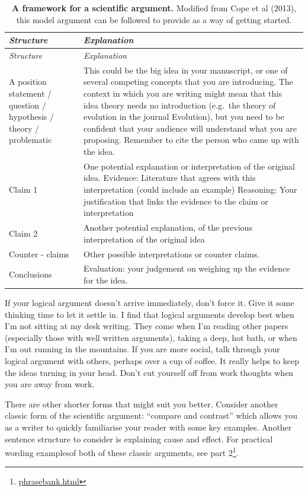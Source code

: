 \documentclass[
]{krantz}
\renewcommand{\href}[2]{#2\footnote{\url{#1}}}
\begin{document}
\begin{longtable}[]{@{}
  >{\raggedright\arraybackslash}p{}
  >{\raggedright\arraybackslash}p{}@{}}
\caption{\label{tab:argument} \textbf{A framework for a scientific argument.} Modified from Cope et al (2013), this model argument can be followed to provide as a way of getting started.}\tabularnewline
\toprule
\emph{Structure} & \emph{Explanation} \\
\midrule
\endfirsthead
\toprule
\emph{Structure} & \emph{Explanation} \\
\midrule
\endhead
A position statement / question / hypothesis / theory / problematic & This could be the big idea in your manuscript, or one of several competing concepts that you are introducing. The context in which you are writing might mean that this idea theory needs no introduction (e.g.~the theory of evolution in the journal Evolution), but you need to be confident that your audience will understand what you are proposing. Remember to cite the person who came up with the idea. \\
Claim 1 & One potential explanation or interpretation of the original idea. Evidence: Literature that agrees with this interpretation (could include an example) Reasoning: Your justification that links the evidence to the claim or interpretation \\
Claim 2 & Another potential explanation, of the previous interpretation of the original idea \\
Counter - claims & Other possible interpretations or counter claims. \\
Conclusions & Evaluation: your judgement on weighing up the evidence for the idea. \\
\bottomrule
\end{longtable}

If your logical argument doesn't arrive immediately, don't force it. Give it some thinking time to let it settle in. I find that logical arguments develop best when I'm not sitting at my desk writing. They come when I'm reading other papers (especially those with well written arguments), taking a deep, hot bath, or when I'm out running in the mountains. If you are more social, talk through your logical argument with others, perhaps over a cup of coffee. It really helps to keep the ideas turning in your head. Don't cut yourself off from work thoughts when you are away from work.

There are other shorter forms that might suit you better. Consider another classic form of the scientific argument: ``compare and contrast'' which allows you as a writer to quickly familiarise your reader with some key examples. Another sentence structure to consider is explaining cause and effect. For practical wording examplesof both of these classic arguments, \href{phrasebank.html}{see part 2}.
\end{document}
